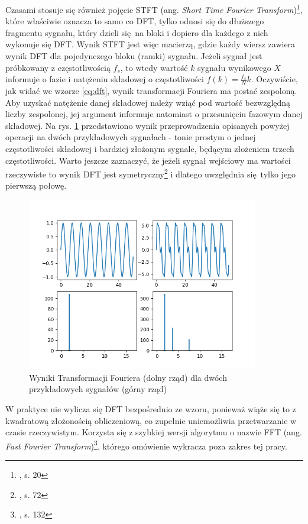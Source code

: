 Czasami stosuje się również pojęcie STFT (ang. \emph{Short Time Fourier Transform})\footnote{\cite{lerch_introduction_2012}, s. 20}, które właściwie oznacza to samo co DFT, tylko odnosi się do dłuższego fragmentu sygnału, który dzieli się na bloki i dopiero dla każdego z nich wykonuje się DFT. Wynik STFT jest więc macierzą, gdzie każdy wiersz zawiera wynik DFT dla pojedynczego bloku (ramki) sygnału. Jeżeli sygnał jest próbkowany z częstotliwością $f_s$, to wtedy wartość $k$ sygnału wynikowego $X$ informuje o fazie i natężeniu składowej o częstotliwości $f(k) = \frac{f_s}{N}k$.  Oczywiście, jak widać we wzorze \ref{eq:dft}, wynik transformacji Fouriera ma postać zespoloną. Aby uzyskać natężenie danej składowej należy wziąć pod wartość bezwzględną liczby zespolonej, jej argument informuje natomiast o przesunięciu fazowym danej składowej. Na rys.  \ref{fig:transformata_fouriera} przedstawiono wynik przeprowadzenia opisanych powyżej operacji na dwóch przykładowych sygnałach - tonie prostym o jednej częstotliwości składowej i bardziej złożonym sygnale, będącym złożeniem trzech częstotliwości. Warto jeszcze zaznaczyć, że jeżeli sygnał wejściowy ma wartości rzeczywiste to wynik DFT jest symetryczny\footnote{\cite{lyons_wprowadzenie_2000}, s. 72} i dlatego uwzględnia się tylko jego pierwszą połowę.

\begin{figure}[htb]
    \centering
    \includegraphics[width=0.9\textwidth]{images/transformata_fouriera}
    \caption{Wyniki Transformacji Fouriera (dolny rząd) dla dwóch przykładowych sygnałów (górny rząd)}
    \label{fig:transformata_fouriera}
\end{figure}

W praktyce nie wylicza się DFT bezpośrednio ze wzoru, ponieważ wiąże się to z kwadratową złożonością obliczeniową, co zupełnie uniemożliwia przetwarzanie w czasie rzeczywistym. Korzysta się z szybkiej wersji algorytmu o nazwie FFT (ang. \emph{Fast Fourier Transform})\footnote{\cite{lyons_wprowadzenie_2000}, s. 132}, którego omówienie wykracza poza zakres tej pracy.

